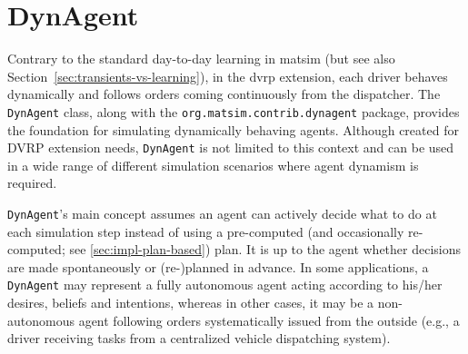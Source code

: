 \section{DynAgent}
\label{sec:dynAgent}
Contrary to the standard day-to-day learning in \gls{matsim} (but see also Section~\ref{sec:transients-vs-learning}), in the \gls{dvrp} extension, each driver behaves dynamically and follows orders coming continuously from the dispatcher. The \lstinline$DynAgent$ class, along with the \lstinline$org.matsim.contrib.dynagent$ package, provides the foundation for simulating dynamically behaving agents. Although created for DVRP extension needs, \lstinline$DynAgent$ is not limited to this context and can be used in a wide range of different simulation scenarios where agent dynamism is required.

\lstinline$DynAgent$'s main concept assumes an agent can actively decide what to do at each simulation step instead of using a pre-computed (and occasionally re-computed; see \ref{sec:impl-plan-based}) plan. It is up to the agent whether decisions are made spontaneously or (re-)planned in advance. In some applications, a \lstinline$DynAgent$ may represent a fully autonomous agent acting according to his/her desires, beliefs and intentions, whereas in other cases, it may be a non-autonomous agent following orders systematically issued from the outside (e.g., a driver receiving tasks from a centralized vehicle dispatching system).

